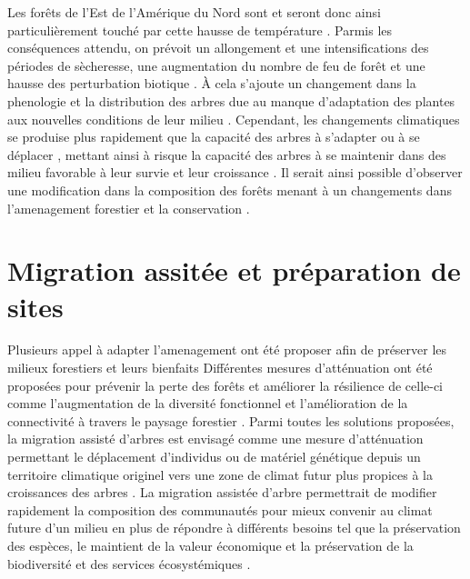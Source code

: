 Les forêts de l'Est de l'Amérique du Nord sont et seront donc ainsi particulièrement touché par cette hausse de température \citep{Park2014Canboreal,Mahony2017closerlook,Messier2022Warningnatural,Sittaro2017Treerange}.
Parmis les conséquences attendu, on prévoit un allongement et une intensifications des périodes de sècheresse, une augmentation du nombre de feu de forêt et une hausse des perturbation biotique \citep{Gatti2021Amazoniacarbon,Heidari2021Effectsclimate,Joyce2013Climatechange,Parmesan2007Influencesspecies}. 
À cela s'ajoute un changement dans la phenologie \citep{Chuine2010Whydoes} et la distribution des arbres \citep{Gray2013Trackingsuitable,Zhu2012Failuremigrate} due au manque d'adaptation des plantes aux nouvelles conditions de leur milieu \citep{Aitken2008Adaptationmigration}.
Cependant, les changements climatiques se produise plus rapidement que la capacité des arbres à s'adapter ou à se déplacer \citep{Aitken2008Adaptationmigration,Harrison2020Plantcommunity,Loarie2009velocityclimate,Messier2022Warningnatural,Williams2013Preparingclimate,Vitt2010Assistedmigration}, 
mettant ainsi à risque la capacité des arbres à se maintenir dans des milieu favorable à leur survie et leur croissance \citep{Sittaro2017Treerange,Woodall2018Decadalchanges,Zhu2012Failuremigrate}.
Il serait ainsi possible d'observer une modification dans la composition des forêts menant à un changements dans l'amenagement forestier et la conservation \citep{Chmura2011Forestresponses,Lo2011Linkingclimate,McKenney2009Climatechange}.

\section*{Migration assitée et préparation de sites}
\label{sec:fam}

Plusieurs appel à adapter l'amenagement ont été proposer afin de préserver les milieux forestiers et leurs bienfaits \citep{Messier2021sakeresilience,Nagel2017Adaptivesilviculture}
Différentes mesures d'atténuation ont été proposées pour prévenir la perte des forêts et améliorer la résilience de celle-ci comme l'augmentation de la diversité fonctionnel et l'amélioration de la connectivité à travers le paysage forestier \citep{Messier2019functionalcomplex}.
Parmi toutes les solutions proposées, la migration assisté d'arbres est envisagé comme une mesure d'atténuation permettant le déplacement d'individus ou de matériel génétique depuis un territoire climatique originel vers une zone de climat futur plus propices à la croissances des arbres \citep{Dumroese2015Considerationsrestoring,Palik2022Operationalizingforestassisted,Park2023Provenancetrials,Park2018Informationunderload,Pedlar2011implementationassisted,Vitt2010Assistedmigration,Williams2013Preparingclimate}. 
La migration assistée d'arbre permettrait de modifier rapidement la composition des communautés pour mieux convenir au climat future d'un milieu \citep{Pedlar2011implementationassisted} 
en plus de répondre à différents besoins tel que la préservation des espèces, le maintient de la valeur économique et la préservation de la biodiversité et des services écosystémiques \citep{Ste-Marie2011Assistedmigration,Winder2011Ecologicalimplications}.

